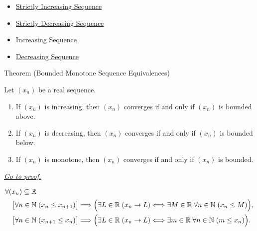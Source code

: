 \begin{dependencies}
\begin{itemize}
  \item \hyperref[def:strictly-increasing-sequence]{Strictly Increasing Sequence}
  \item \hyperref[def:strictly-decreasing-sequence]{Strictly Decreasing Sequence}
  \item \hyperref[def:increasing-sequence]{Increasing Sequence}
  \item \hyperref[def:decreasing-sequence]{Decreasing Sequence}
\end{itemize}
\end{dependencies}


\begin{theorembox}{Theorem (Bounded Monotone Sequence Equivalences)}
\begin{theorem}
\label{thm:bounded-monotone-sequence-equivalences}
Let $(x_n)$ be a real sequence.
\begin{enumerate}[label=(\alph*)]
  \item If $(x_n)$ is increasing, then $(x_n)$ converges if and only if
  $(x_n)$ is bounded above.
  \item If $(x_n)$ is decreasing, then $(x_n)$ converges if and only if
  $(x_n)$ is bounded below.
  \item If $(x_n)$ is monotone, then $(x_n)$ converges if and only if
  $(x_n)$ is bounded.
\end{enumerate}

\smallskip
\noindent
\hyperref[prf:bounded-monotone-sequence-equivalences]{\textit{Go to proof.}}
\end{theorem}
\end{theorembox}

\begin{remark*}
\[
\begin{aligned}
&\forall (x_n)\subseteq\mathbb{R}\\
&\quad
\bigl[\forall n\in\mathbb{N}\;(x_n\le x_{n+1})\bigr]
\Longrightarrow
\Bigl(
  \exists L\in\mathbb{R}\;(x_n\to L)
  \Longleftrightarrow
  \exists M\in\mathbb{R}\;\forall n\in\mathbb{N}\;(x_n\le M)
\Bigr),\\
&\quad
\bigl[\forall n\in\mathbb{N}\;(x_{n+1}\le x_n)\bigr]
\Longrightarrow
\Bigl(
  \exists L\in\mathbb{R}\;(x_n\to L)
  \Longleftrightarrow
  \exists m\in\mathbb{R}\;\forall n\in\mathbb{N}\;(m\le x_n)
\Bigr).
\end{aligned}
\]
\end{remark*}

